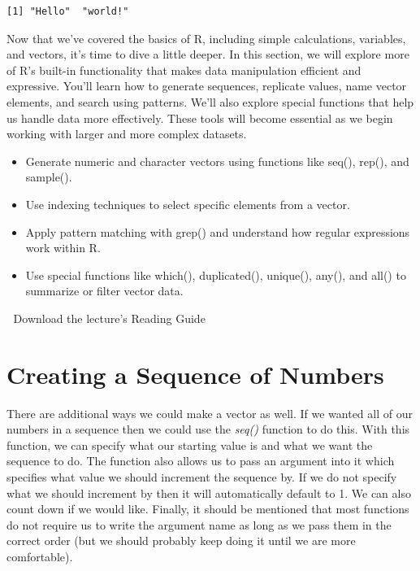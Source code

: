 \documentclass[
  letterpaper,
  DIV=11,
  numbers=noendperiod]{scrreprt}
\providecommand{\tightlist}{%
  \setlength{\itemsep}{0pt}\setlength{\parskip}{0pt}}
\begin{document}
\begin{verbatim}
[1] "Hello"  "world!"
\end{verbatim}

Now that we've covered the basics of R, including simple calculations,
variables, and vectors, it's time to dive a little deeper. In this
section, we will explore more of R's built-in functionality that makes
data manipulation efficient and expressive. You'll learn how to generate
sequences, replicate values, name vector elements, and search using
patterns. We'll also explore special functions that help us handle data
more effectively. These tools will become essential as we begin working
with larger and more complex datasets.

\begin{itemize}
\tightlist
\item
  Generate numeric and character vectors using functions like seq(),
  rep(), and sample().
\item
  Use indexing techniques to select specific elements from a vector.
\item
  Apply pattern matching with grep() and understand how regular
  expressions work within R.
\item
  Use special functions like which(), duplicated(), unique(), any(), and
  all() to summarize or filter vector data.
\end{itemize}

\begin{tcolorbox}[enhanced jigsaw, leftrule=.75mm, arc=.35mm, coltitle=black, rightrule=.15mm, bottomrule=.15mm, toprule=.15mm, left=2mm, colbacktitle=quarto-callout-tip-color!10!white, title=\textcolor{quarto-callout-tip-color}{\faLightbulb}\hspace{0.5em}{Supplemental Material}, toptitle=1mm, breakable, colframe=quarto-callout-tip-color-frame, bottomtitle=1mm, titlerule=0mm, colback=white, opacityback=0, opacitybacktitle=0.6]

📄 Download the lecture's Reading Guide

\end{tcolorbox}

\section{Creating a Sequence of
Numbers}\label{creating-a-sequence-of-numbers}

There are additional ways we could make a vector as well. If we wanted
all of our numbers in a sequence then we could use the \emph{seq()}
function to do this. With this function, we can specify what our
starting value is and what we want the sequence to do. The function also
allows us to pass an argument into it which specifies what value we
should increment the sequence by. If we do not specify what we should
increment by then it will automatically default to 1. We can also count
down if we would like. Finally, it should be mentioned that most
functions do not require us to write the argument name as long as we
pass them in the correct order (but we should probably keep doing it
until we are more comfortable).
\end{document}
